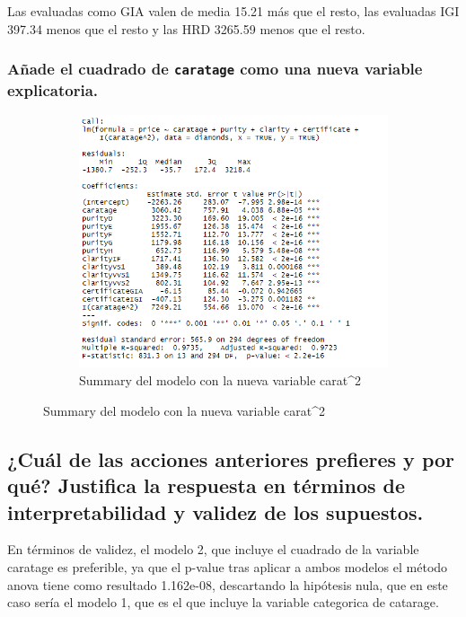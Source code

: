 \documentclass[a4paper, 9pt]{article}
\begin{document}
Las evaluadas como GIA valen de media 15.21 más que el resto, las evaluadas IGI 397.34 menos que el resto y las HRD  3265.59 menos que el resto.

\subsubsection{Añade el cuadrado de \texttt{caratage} como una nueva variable explicatoria.}

\begin{figure}[h!]
  \centering
  \begin{subfigure}[b]{0.8\linewidth}
    \includegraphics[width=\linewidth]{report/images/question-3/3b-summary.png}
    \caption{Summary del modelo con la nueva variable carat^2}
  \end{subfigure}
  \label{fig:coffee}
\end{figure}


\subsection{¿Cuál de las acciones anteriores prefieres y por qué? Justifica la respuesta en términos de interpretabilidad y validez de los supuestos.}
\label{subsec:question-4}

En términos de validez, el modelo 2, que incluye el cuadrado de la variable caratage es preferible, ya que el p-value tras aplicar a ambos modelos el método anova tiene como resultado 1.162e-08, descartando la hipótesis nula, que en este caso sería el modelo 1, que es el que incluye la variable categorica de catarage.
\end{document}
